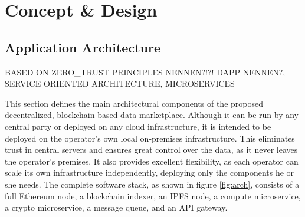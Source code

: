 \chapter{Concept \& Design}
\label{cha:cod}

\section{Application Architecture}
\label{section:software_architecture}

BASED ON ZERO_TRUST PRINCIPLES NENNEN?!?! DAPP NENNEN?, SERVICE ORIENTED ARCHITECTURE, MICROSERVICES

This section defines the main architectural components of the proposed decentralized, blockchain-based data marketplace. Although it can be run by any central party or deployed on any cloud infrastructure, it is intended to be deployed on the operator's own local on-premises infrastructure. This eliminates trust in central servers and ensures great control over the data, as it never leaves the operator's premises. It also provides excellent flexibility, as each operator can scale its own infrastructure independently, deploying only the components he or she needs. The complete software stack, as shown in figure \ref{fig:arch}, consists of a full Ethereum node, a blockchain indexer, an IPFS node, a compute microservice, a crypto microservice, a message queue, and an API gateway.


        
